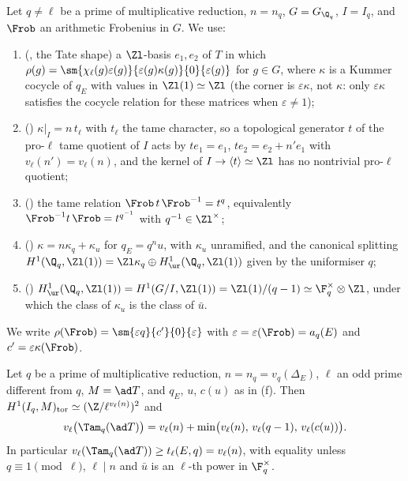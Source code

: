 \begin{convention}\label{conv:blochkato:tate-data}
Let $q\ne\ell$ be a prime of multiplicative reduction, $n=n_q$, $G=G_{\Q_q}$, $I=I_q$, and $\Frob$ an arithmetic Frobenius in $G$. We use:
\begin{enumerate}[label=(\alph*)]
\item (, the Tate shape) a $\Zl$-basis $e_1,e_2$ of $T$ in which $\rho(g)=\sm{\chi_\ell(g)\varepsilon(g)}{\varepsilon(g)\kappa(g)}{0}{\varepsilon(g)}$ for $g\in G$, where $\kappa$ is a Kummer
cocycle of $q_E$ with values in $\Zl(1)\simeq\Zl$ (the corner is $\varepsilon\kappa$, not $\kappa$: only $\varepsilon\kappa$ satisfies the cocycle relation for these matrices when $\varepsilon\ne1$);
\item () $\kappa|_I=n\,t_\ell$ with $t_\ell$ the tame character, so a topological generator $t$ of the pro-$\ell$ tame quotient of $I$ acts by $te_1=e_1$,
$te_2=e_2+n'e_1$ with $v_\ell(n')=v_\ell(n)$, and the kernel of $I\to\langle t\rangle\simeq\Zl$ has no nontrivial pro-$\ell$ quotient;
\item () the tame relation $\Frob\,t\,\Frob^{-1}=t^q$, equivalently $\Frob^{-1}t\,\Frob=t^{q^{-1}}$ with $q^{-1}\in\Zl^\times$;
\item () $\kappa=n\kappa_q+\kappa_u$ for $q_E=q^nu$, with $\kappa_u$ unramified, and the canonical splitting $H^1(\Q_q,\Zl(1))=\Zl\kappa_q\oplus H^1_{\ur}(\Q_q,\Zl(1))$ given by the
uniformiser $q$;
\item () $H^1_{\ur}(\Q_q,\Zl(1))=H^1(G/I,\Zl(1))=\Zl(1)/(q-1)\simeq\F_q^\times\otimes\Zl$, under which the class of $\kappa_u$ is the class of $\bar u$.
\end{enumerate}
We write $\rho(\Frob)=\sm{\varepsilon q}{c'}{0}{\varepsilon}$ with $\varepsilon=\varepsilon(\Frob)=a_q(E)$ and $c'=\varepsilon\kappa(\Frob)$.
\end{convention}

\begin{lemma}\label{lem:blochkato:tamfactor}
Let $q$ be a prime of multiplicative reduction, $n=n_q=v_q(\Delta_E)$, $\ell$ an odd prime different from $q$, $M=\ad T$, and $q_E$, $u$, $c(u)$ as in
(f). Then $H^1(I_q,M)_{\mathrm{tor}}\simeq(\Z/\ell^{v_\ell(n)})^2$ and
\[
v_\ell\bigl(\Tam_q(\ad T)\bigr)=v_\ell(n)+\min\bigl(v_\ell(n),\,v_\ell(q-1),\,v_\ell(c(u))\bigr).
\]
In particular $v_\ell(\Tam_q(\ad T))\ge t_\ell(E,q)=v_\ell(n)$, with equality unless $q\equiv1\pmod\ell$, $\ell\mid n$ and $\bar u$ is an $\ell$-th power in $\F_q^\times$.
\end{lemma}

